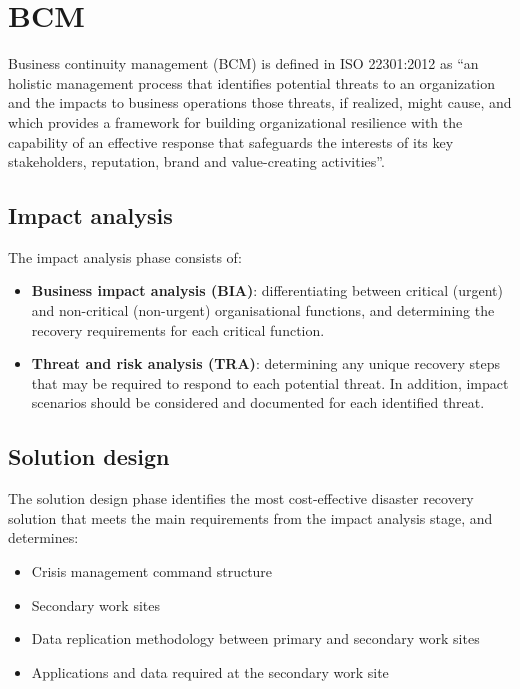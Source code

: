 \documentclass[a4paper,12pt]{article}
\begin{document}
\clearpage

\printindex

\section{BCM}
Business continuity management (BCM) is defined in ISO 22301:2012 as “an holistic management process that identifies potential threats to an organization and the impacts to business operations those threats, if realized, might cause, and which provides a framework for building organizational resilience with the capability of an effective response that safeguards the interests of its key stakeholders, reputation, brand and value-creating activities”.

\subsection{ Impact analysis }
The impact analysis phase consists of:

\begin{itemize}
\item \textbf{Business impact analysis (BIA)}: differentiating between critical (urgent) and non-critical (non-urgent) organisational functions, and determining the recovery requirements for each critical function.
\item \textbf{Threat and risk analysis (TRA)}: determining any unique recovery steps that may be required to respond to each potential threat.
In addition, impact scenarios should be considered and documented for each identified threat.
\end{itemize}

\subsection{Solution design}
The solution design phase identifies the most cost-effective disaster recovery solution that meets the main requirements from the impact analysis stage, and determines:

\begin{itemize}
\item Crisis management command structure
\item Secondary work sites
\item Data replication methodology between primary and secondary work sites
\item Applications and data required at the secondary work site
\end{itemize}
\end{document}
